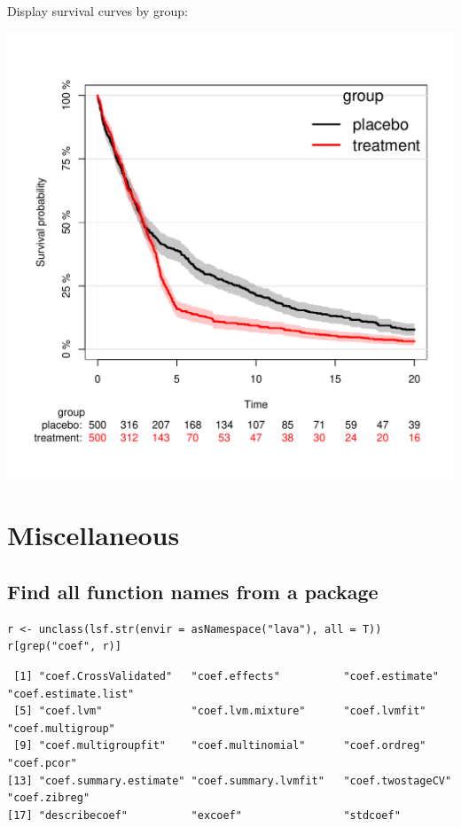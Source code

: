 \documentclass{article}
\begin{document}
Display survival curves by group:
\begin{center}
\includegraphics[width=.9\linewidth]{./figures/fig-delayedTreatmentEffect.pdf}
\end{center}

\section{Miscellaneous}
\label{sec:orgd686fc5}
\subsection{Find all function names from a package}
\label{sec:org3a4fc83}
\lstset{language=r,label= ,caption= ,captionpos=b,numbers=none}
\begin{lstlisting}
r <- unclass(lsf.str(envir = asNamespace("lava"), all = T))
r[grep("coef", r)]
\end{lstlisting}

\begin{verbatim}
 [1] "coef.CrossValidated"   "coef.effects"          "coef.estimate"         "coef.estimate.list"   
 [5] "coef.lvm"              "coef.lvm.mixture"      "coef.lvmfit"           "coef.multigroup"      
 [9] "coef.multigroupfit"    "coef.multinomial"      "coef.ordreg"           "coef.pcor"            
[13] "coef.summary.estimate" "coef.summary.lvmfit"   "coef.twostageCV"       "coef.zibreg"          
[17] "describecoef"          "excoef"                "stdcoef"
\end{verbatim}
\end{document}
